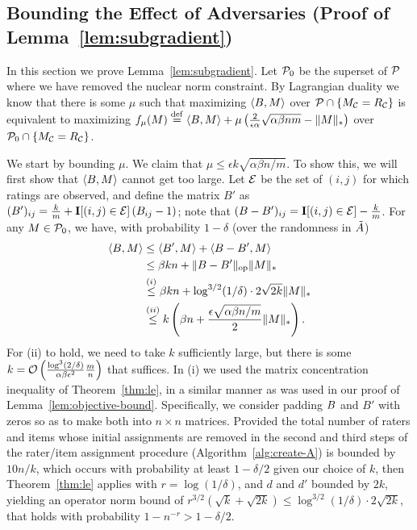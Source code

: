 \subsection{Bounding the Effect of Adversaries (Proof of Lemma~\ref{lem:subgradient})}
\label{sec:subgradient-proof}
In this section we prove Lemma~\ref{lem:subgradient}.
Let $\mathcal{P}_0$ be the superset of $\mathcal{P}$ where we have removed the 
nuclear norm constraint. By Lagrangian duality we 
know that there is some $\mu$ such that maximizing 
$\langle B, M \rangle$ over $\mathcal{P} \cap \{M_{\mathcal{C}} = R_{\mathcal{C}}\}$ 
is equivalent to maximizing $f_\mu(M) \stackrel{\rm def}{=} \langle B, M \rangle + \mu\left( \frac{2}{\epsilon\alpha}\sqrt{\alpha\beta nm} - \|M\|_* \right)$ over 
$\mathcal{P}_0 \cap \{M_{\mathcal{C}} = R_{\mathcal{C}}\}$. 

We start by bounding $\mu$. We claim that 
$\mu \leq \epsilon k \sqrt{\alpha\beta n/m}$. 
To show this, we will first show that $\langle B, M \rangle$ cannot get 
too large. Let $\mathcal{E}$ be the set of $(i,j)$ for which ratings are observed, 
and define the matrix $B'$ as 
$(B')_{ij} = \frac{k}{m} + \mathbf{I}[(i,j) \in \mathcal{E}]\left( B_{ij} - 1 \right)$; note 
that $(B-B')_{ij} = \mathbf{I}[(i,j) \in \mathcal{E}] - \frac{k}{m}$.
For any $M \in \mathcal{P}_0$, we have, with probability $1-\delta$ (over the randomness in $\tilde{A}$)
\begin{align}
\langle B, M \rangle &\leq \langle B', M \rangle + \langle B - B', M \rangle \\
 &\leq \beta kn + \|B - B'\|_{\mathrm{op}}\|M\|_* \\
 &\stackrel{(i)}{\leq} \beta kn + \log^{3/2}(1/\delta) \cdot 2\sqrt{2k}\|M\|_* \\
 &\stackrel{(ii)}{\leq} k\left( \beta n +  \frac{\epsilon\sqrt{\alpha\beta n/m}}{2} \|M\|_* \right).
\end{align}
For (ii) to hold, we need to take $k$ sufficiently large, but 
there is some $k = \mathcal{O}\left( \frac{\log^3(2/\delta)}{\alpha\beta\epsilon^2}\frac{m}{n} \right)$ 
that suffices.
In (i) we used the matrix concentration inequality of Theorem~\ref{thm:le}, in a similar manner as was used in our proof of Lemma~\ref{lem:objective-bound}.  Specifically, we consider padding $B$ and $B'$ with zeros so as to make both into $n\times n$ matrices. Provided the total number of raters and items whose initial assignments are removed in the second and third steps of the rater/item assignment procedure (Algorithm~\ref{alg:create-A}) is bounded by $10n/k$, which occurs with probability at least $1-\delta/2$ given our choice of $k$, then Theorem~\ref{thm:le} applies with $r = \log (1/\delta)$, and $d$ and $d'$ bounded by $2k$, yielding an operator norm bound of $r^{3/2}(\sqrt{k} +\sqrt{2k}) \le \log^{3/2}(1/\delta) \cdot 2\sqrt{2k}$, that holds with probability $1-n^{-r} > 1-\delta/2$.  

